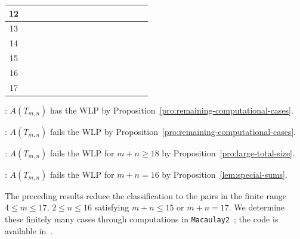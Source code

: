\documentclass[12pt,twoside]{amsart}
\theoremstyle{definition}
\theoremstyle{mystyle}
\begin{document}
\begin{table}[!ht]
\begin{tabular}{|c|*{15}{c|}}
		\hline
		12
		& \wlpNo & \wlpNo & \wlpSixteen & \wlpNo & \wlpLarge
		& \wlpLarge & \wlpLarge & \wlpLarge & \wlpLarge & \wlpLarge
		& \wlpLarge & \wlpLarge & \wlpLarge & \wlpLarge & \wlpLarge\\
		\hline
		13
		& \wlpNo & \wlpSixteen & \wlpYes & \wlpLarge & \wlpLarge
		& \wlpLarge & \wlpLarge & \wlpLarge & \wlpLarge & \wlpLarge
		& \wlpLarge & \wlpLarge & \wlpLarge & \wlpLarge & \wlpLarge\\
		\hline
		14
		& \wlpSixteen & \wlpYes & \wlpLarge & \wlpLarge & \wlpLarge
		& \wlpLarge & \wlpLarge & \wlpLarge & \wlpLarge & \wlpLarge
		& \wlpLarge & \wlpLarge & \wlpLarge & \wlpLarge & \wlpLarge\\
		\hline
		15
		& \wlpNo & \wlpLarge & \wlpLarge & \wlpLarge & \wlpLarge
		& \wlpLarge & \wlpLarge & \wlpLarge & \wlpLarge & \wlpLarge
		& \wlpLarge & \wlpLarge & \wlpLarge & \wlpLarge & \wlpLarge\\
		\hline
		16
		& \wlpLarge & \wlpLarge & \wlpLarge & \wlpLarge & \wlpLarge
		& \wlpLarge & \wlpLarge & \wlpLarge & \wlpLarge & \wlpLarge
		& \wlpLarge & \wlpLarge & \wlpLarge & \wlpLarge & \wlpLarge\\
		\hline
		17
		& \wlpLarge & \wlpLarge & \wlpLarge & \wlpLarge & \wlpLarge
		& \wlpLarge & \wlpLarge & \wlpLarge & \wlpLarge & \wlpLarge
		& \wlpLarge & \wlpLarge & \wlpLarge & \wlpLarge & \wlpLarge\\
		\hline
	\end{tabular}
	\endgroup
	
	\medskip
	\begin{minipage}{\textwidth}
		\small
		\raggedright
		
		\hspace*{1.5cm}\wlpYes:
		$A(T_{m,n})$ has the WLP by
		Proposition~\ref{pro:remaining-computational-cases}.
		\par\smallskip
		
		\hspace*{1.5cm}\wlpNo:
		$A(T_{m,n})$ fails the WLP by
		Proposition~\ref{pro:remaining-computational-cases}.
		\par\smallskip
		
		\hspace*{1.5cm}\wlpLarge:
		$A(T_{m,n})$ fails the WLP for $m+n\geq18$ by
		Proposition~\ref{pro:large-total-size}.
		\par\smallskip
		
		\hspace*{1.5cm}\wlpSixteen:
		$A(T_{m,n})$ fails the WLP for $m+n=16$ by
		Proposition~\ref{lem:special-sums}.
		
	\end{minipage}
\end{table}
The preceding results reduce the classification to the pairs in the
finite range $4\leq m\leq17$, $2\leq n\leq16$ satisfying
$m+n\leq15$ or $m+n=17$. We determine these finitely many cases through computations in
\texttt{Macaulay2}~\cite{GS}; the code is available
in~\cite{HPS26M2}.
\end{document}
